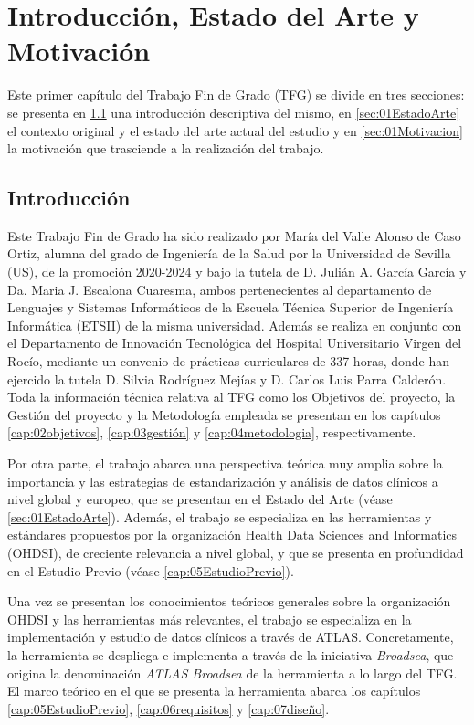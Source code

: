 \chapter{Introducción, Estado del Arte y Motivación}\label{cap:introduccion}

Este primer capítulo del Trabajo Fin de Grado (TFG) se divide en tres secciones: se presenta en \ref{sec:01Intro} una introducción descriptiva del mismo, en \ref{sec:01EstadoArte} el contexto original y el estado del arte actual del estudio y en \ref{sec:01Motivacion} la motivación que trasciende a la realización del trabajo.

\section{Introducción} \label{sec:01Intro}

Este Trabajo Fin de Grado ha sido realizado por María del Valle Alonso de Caso Ortiz, alumna del grado de Ingeniería de la Salud por la Universidad de Sevilla (US), de la promoción 2020-2024 y bajo la tutela de D. Julián A. García García y Da. Maria J. Escalona Cuaresma, ambos pertenecientes al departamento de Lenguajes y Sistemas Informáticos de la Escuela Técnica Superior de Ingeniería Informática (ETSII) de la misma universidad. Además se realiza en conjunto con el Departamento de Innovación Tecnológica del Hospital Universitario Virgen del Rocío, mediante un convenio de prácticas curriculares de 337 horas, donde han ejercido la tutela D. Silvia Rodríguez Mejías y D. Carlos Luis Parra Calderón. Toda la información técnica relativa al TFG como los Objetivos del proyecto, la Gestión del proyecto y la Metodología empleada se presentan en los capítulos \ref{cap:02objetivos}, \ref{cap:03gestión} y \ref{cap:04metodologia}, respectivamente.

Por otra parte, el trabajo abarca una perspectiva teórica muy amplia sobre la importancia y las estrategias de estandarización y análisis de datos clínicos a nivel global y europeo, que se presentan en el Estado del Arte (véase \ref{sec:01EstadoArte}). Además, el trabajo se especializa en las herramientas y estándares propuestos por la organización \Observational Health Data Sciences and Informatics (OHDSI), de creciente relevancia a nivel global, y que se presenta en profundidad en el Estudio Previo (véase \ref{cap:05EstudioPrevio}).

Una vez se presentan los conocimientos teóricos generales sobre la organización OHDSI y las herramientas más relevantes, el trabajo se especializa en la implementación y estudio de datos clínicos a través de ATLAS. Concretamente, la herramienta se despliega e implementa a través de la iniciativa \textit{Broadsea}, que origina la denominación \textit{ATLAS Broadsea} de la herramienta a lo largo del TFG. El marco teórico en el que se presenta la herramienta abarca los capítulos \ref{cap:05EstudioPrevio}, \ref{cap:06requisitos} y \ref{cap:07diseño}.

